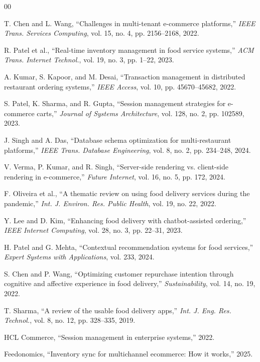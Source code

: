 \documentclass[conference]{IEEEtran}
\begin{document}
\begin{thebibliography}{00}

 T. Chen and L. Wang, ``Challenges in multi-tenant e-commerce platforms,'' \textit{IEEE Trans. Services Computing}, vol. 15, no. 4, pp. 2156--2168, 2022.

 R. Patel et al., ``Real-time inventory management in food service systems,'' \textit{ACM Trans. Internet Technol.}, vol. 19, no. 3, pp. 1--22, 2023.

 A. Kumar, S. Kapoor, and M. Desai, ``Transaction management in distributed restaurant ordering systems,'' \textit{IEEE Access}, vol. 10, pp. 45670--45682, 2022.

 S. Patel, K. Sharma, and R. Gupta, ``Session management strategies for e-commerce carts,'' \textit{Journal of Systems Architecture}, vol. 128, no. 2, pp. 102589, 2023.

 J. Singh and A. Das, ``Database schema optimization for multi-restaurant platforms,'' \textit{IEEE Trans. Database Engineering}, vol. 8, no. 2, pp. 234--248, 2024.

 V. Verma, P. Kumar, and R. Singh, ``Server-side rendering vs. client-side rendering in e-commerce,'' \textit{Future Internet}, vol. 16, no. 5, pp. 172, 2024.

 F. Oliveira et al., ``A thematic review on using food delivery services during the pandemic,'' \textit{Int. J. Environ. Res. Public Health}, vol. 19, no. 22, 2022.

 Y. Lee and D. Kim, ``Enhancing food delivery with chatbot-assisted ordering,'' \textit{IEEE Internet Computing}, vol. 28, no. 3, pp. 22--31, 2023.

 H. Patel and G. Mehta, ``Contextual recommendation systems for food services,'' \textit{Expert Systems with Applications}, vol. 233, 2024.

 S. Chen and P. Wang, ``Optimizing customer repurchase intention through cognitive and affective experience in food delivery,'' \textit{Sustainability}, vol. 14, no. 19, 2022.

 T. Sharma, ``A review of the usable food delivery apps,'' \textit{Int. J. Eng. Res. Technol.}, vol. 8, no. 12, pp. 328--335, 2019.

 HCL Commerce, ``Session management in enterprise systems,'' 2022.

 Feedonomics, ``Inventory sync for multichannel ecommerce: How it works,'' 2025.


\end{thebibliography}
\end{document}
